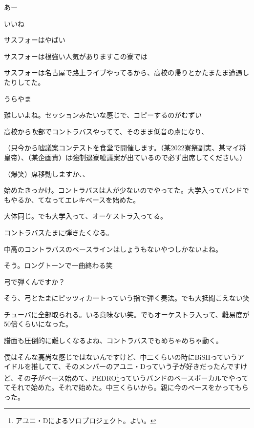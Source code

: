\begin{multicols}{3}
あー

いいね

サスフォーはやばい

サスフォーは根強い人気がありますこの寮では

サスフォーは名古屋で路上ライブやってるから、高校の帰りとかたまたま遭遇したりしてた。

うらやま

難しいよね。セッションみたいな感じで、コピーするのがむずい
 

\vspace{10mm}
\noindent{}

高校から吹部でコントラバスやってて、そのまま低音の虜になり、

（只今から嘘議案コンテストを食堂で開催します。（某2022寮祭副実、某マイ将皇帝）、（某企画責）は強制退寮嘘議案が出ているので必ず出席してください。）

（爆笑）席移動しますか、、
 

始めたきっかけ。コントラバスは人が少ないのでやってた。大学入ってバンドでもやるか、てなってエレキベースを始めた。

大体同じ。でも大学入って、オーケストラ入ってる。

コントラバスたまに弾きたくなる。

中高のコントラバスのベースラインはしょうもないやつしかないよね。

そう。ロングトーンで一曲終わる笑

弓で弾くんですか？

そう、弓とたまにピッツィカートっていう指で弾く奏法。でも大抵聞こえない笑

チューバに全部取られる。いる意味ない笑。でもオーケストラ入って、難易度が50倍くらいになった。

譜面も圧倒的に難しくなるよね、コントラバスでもめちゃめちゃ動く。

僕はそんな高尚な感じではないんですけど、中二くらいの時にBiSHっていうアイドルを推してて、そのメンバーのアユニ・Dっていう子が好きだったんですけど、その子がベース始めて、PEDRO\footnote{アユニ・Dによるソロプロジェクト。よい。}っていうバンドのベースボーカルでやっててそれで始めた。それで始めた。中三くらいから。親に今のベースをかってもらった。


\end{multicols}
